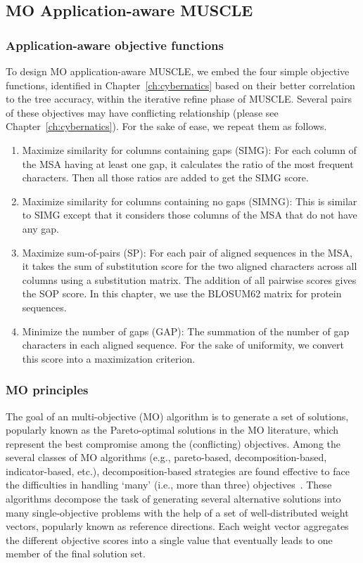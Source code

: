 

\subsection{MO Application-aware MUSCLE} \label{sec:ma-muscle}

\subsubsection{Application-aware objective functions}
To design MO application-aware MUSCLE, we embed the four simple objective functions, identified in Chapter~\ref{ch:cybernatics} based on their better correlation to the tree accuracy, within the iterative refine phase of MUSCLE. Several pairs of these objectives may have conflicting relationship (please see Chapter~\ref{ch:cybernatics}). For the sake of ease, we repeat them as follows.
\begin{enumerate}
	\item Maximize similarity for columns containing gaps (SIMG): For each column of the MSA having at least one gap, it calculates the ratio of the most frequent characters. Then all those ratios are added to get the SIMG score.
	\item Maximize similarity for columns containing no gaps (SIMNG): This is similar to SIMG except that it considers those columns of the MSA that do not have any gap.
	\item Maximize sum-of-pairs (SP): For each pair of aligned sequences in the MSA, it takes the sum of substitution score for the two aligned characters across all columns using a substitution matrix. The addition of all pairwise scores gives the SOP score. In this chapter, we use the BLOSUM62 matrix for protein sequences.
	\item Minimize the number of gaps (GAP): The summation of the number of gap characters in each aligned sequence. For the sake of uniformity, we convert this score into a maximization criterion.
\end{enumerate}


\subsubsection{MO principles}
The goal of an multi-objective (MO) algorithm is to generate a set of solutions, popularly known as the Pareto-optimal solutions in the MO literature, which represent the best compromise among the (conflicting) objectives. 
Among the several classes of MO algorithms (e.g., pareto-based, decomposition-based, indicator-based, etc.), decomposition-based strategies are found effective to face the difficulties in handling `many' (i.e., more than three) objectives~\cite{li2015many}. These algorithms decompose the task of generating several alternative solutions into many single-objective problems with the help of a set of well-distributed weight vectors, popularly known as reference directions. Each weight vector aggregates the different objective scores into a single value that eventually leads to one member of the final solution set.

